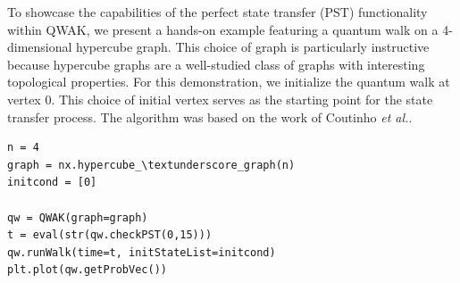 \documentclass[../../main.tex]{subfiles}
\begin{document}
%
%
%
%
%
%

To showcase the capabilities of the perfect state transfer (PST) functionality
within QWAK, we present a hands-on example featuring a quantum walk on a
4-dimensional hypercube graph. This choice of graph is particularly instructive
because hypercube graphs are a well-studied class of graphs with interesting
topological properties. For this demonstration, we initialize the quantum walk
at vertex $0$. This choice of initial vertex serves as the starting point for
the state transfer process. The algorithm was based on the work of Coutinho \textit{et al.}\cite{coutinho17}.

\begin{lstlisting}[style=code,escapeinside={__}]
n = 4
graph = nx.hypercube_\textunderscore_graph(n)
initcond = [0]

qw = QWAK(graph=graph)
t = eval(str(qw.checkPST(0,15)))
qw.runWalk(time=t, initStateList=initcond)
plt.plot(qw.getProbVec())
\end{lstlisting}
\end{document}
